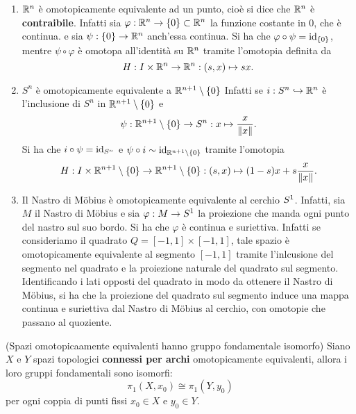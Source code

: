 \documentclass[]{article}
\begin{document}
\begin{example} \nl
    \begin{enumerate} 
        \item $\mathbb{R}^n$ \`e omotopicamente equivalente ad un punto, cio\`e si dice che $\mathbb{R}^n$ \`e \textbf{contraibile}.
            Infatti sia $\varphi: \mathbb{R}^n \to \left\{ 0 \right\} \subset \mathbb{R}^n$ la funzione costante in $0$, che è continua.
            e sia $\psi: \left\{ 0 \right\} \to \mathbb{R}^n$ anch'essa continua. \nl
            Si ha che $\varphi \circ \psi = \mathrm{id}_{\left\{ 0 \right\}}$, mentre $\psi \circ \varphi$ è omotopa all'identità su $\mathbb{R}^n$ tramite l'omotopia
            definita da
            \[
                H: I \times \mathbb{R}^n \to \mathbb{R}^n: (s,x) \mapsto s x.
            \]
        \item $S^n$ \`e omotopicamente equivalente a $\mathbb{R}^{n+1} \setminus{\left\{ 0 \right\}}$ \nl
        Infatti se $i: S^n \hookrightarrow \mathbb{R}^n$ \`e l'inclusione di $S^n$ in $\mathbb{R}^{n+1} \setminus{\left\{ 0 \right\}}$ e
        \[  
            \psi: \mathbb{R}^{n+1} \setminus{\left\{ 0 \right\}} \to S^n: x \mapsto \frac{x}{\left\| x \right\|}.
        \]
        Si ha che $i \circ \psi = \mathrm{id}_{S^n}$ e $\psi \circ i \sim \mathrm{id}_{\mathbb{R}^{n+1} \setminus{\left\{ 0 \right\}}}$ tramite l'omotopia
        \[
            H: I \times \mathbb{R}^{n+1} \setminus{\left\{ 0 \right\}} \to \mathbb{R}^{n+1} \setminus{\left\{ 0 \right\}}: (s,x) \mapsto (1-s)x + s\frac{x}{\left\| x \right\|}.
        \]
        \item Il Nastro di Möbius \`e omotopicamente equivalente al cerchio $S^{1}$. \nl
            Infatti, sia $M$ il Nastro di Möbius e sia $\varphi: M \to S^{1}$ la proiezione che manda ogni punto del nastro sul suo bordo.
            Si ha che $\varphi$ è continua e suriettiva. \nl
            Infatti se consideriamo il quadrato $Q = [-1,1] \times [-1,1]$, tale spazio \`e omotopicamente equivalente al segmento
            $[-1,1]$ tramite l'inlcusione del segmento nel quadrato e la proiezione naturale del quadrato sul segmento.
            Identificando i lati opposti del quadrato in modo da ottenere il Nastro di Möbius, si ha che
            la proiezione del quadrato sul segmento induce una mappa continua e suriettiva dal Nastro di Möbius al cerchio, con omotopie 
            che passano al quoziente.
        \end{enumerate}
\end{example}

\begin{theorem} (Spazi omotopicaamente equivalenti hanno gruppo fondamentale isomorfo) \nl
    Siano $X$ e $Y$ spazi topologici \textbf{connessi per archi} omotopicamente equivalenti, allora i loro gruppi fondamentali sono isomorfi:
    \[
        \pi_1(X, x_0) \cong \pi_1(Y, y_0)
    \]
    per ogni coppia di punti fissi $x_0 \in X$ e $y_0 \in Y$.
\end{theorem}
\end{document}
